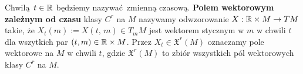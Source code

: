 \begin{figure}[!h]
\centering
{}
\end{figure}

Chwilą \(t\in\mathbb{R}\) będziemy nazywać zmienną czasową. \textbf{Polem wektorowym zależnym od czasu} klasy \(C^r\) na \(M\) nazywamy odwzorowanie \(X:\mathbb{R}\times M\rightarrow TM\) takie, że \(X_t(m):=X(t,\,m) \in T_{m} M\) jest wektorem stycznym w \(m\) w chwili \(t\) dla wszytkich par \((t, m) \in \mathbb{R} \times M\). Przez \(X_t\in \mathfrak{X}^r(M)\) oznaczamy pole wektorowe na \(M\) w chwili \(t\), gdzie \(\mathfrak{X}^r(M)\) to zbiór wszystkich pól wektorowych klasy \(C^r\) na \(M\). 

